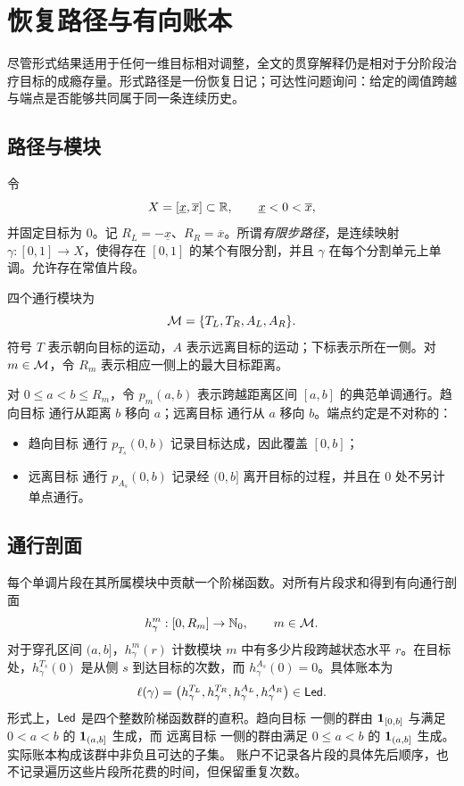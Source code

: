 \section{恢复路径与有向账本}\label{sec:environment}

尽管形式结果适用于任何一维目标相对调整，全文的贯穿解释仍是相对于分阶段治疗目标的成瘾存量。形式路径是一份恢复日记；可达性问题询问：给定的阈值跨越与端点是否能够共同属于同一条连续历史。

\subsection{路径与模块}

令
\[
 X=[\underline x,\overline x]\subset\mathbb R,
 \qquad \underline x<0<\overline x,
\]
并固定目标为 $0$。记 $R_L=-\underline x$、$R_R=\overline x$。所谓\emph{有限步路径}，是连续映射 $\gamma:[0,1]\to X$，使得存在 $[0,1]$ 的某个有限分割，并且 $\gamma$ 在每个分割单元上单调。允许存在常值片段。

四个通行模块为
\[
 \mathcal M=\{T_L,T_R,A_L,A_R\}.
\]
符号 $T$ 表示朝向目标的运动，$A$ 表示远离目标的运动；下标表示所在一侧。对 $m\in\mathcal M$，令 $R_m$ 表示相应一侧上的最大目标距离。

对 $0\le a<b\le R_m$，令 $p_m(a,b)$ 表示跨越距离区间 $[a,b]$ 的典范单调通行。趋向目标 通行从距离 $b$ 移向 $a$；远离目标 通行从 $a$ 移向 $b$。端点约定是不对称的：
\begin{itemize}
 \item 趋向目标 通行 $p_{T_s}(0,b)$ 记录目标达成，因此覆盖 $[0,b]$；
 \item 远离目标 通行 $p_{A_s}(0,b)$ 记录经 $(0,b]$ 离开目标的过程，并且在 $0$ 处不另计单点通行。
\end{itemize}

\subsection{通行剖面}

每个单调片段在其所属模块中贡献一个阶梯函数。对所有片段求和得到有向通行剖面
\[
 h^m_\gamma:[0,R_m]\to\mathbb N_0,
 \qquad m\in\mathcal M.
\]
对于穿孔区间 $(a,b]$，$h^m_\gamma(r)$ 计数模块 $m$ 中有多少片段跨越状态水平 $r$。在目标处，$h^{T_s}_\gamma(0)$ 是从侧 $s$ 到达目标的次数，而 $h^{A_s}_\gamma(0)=0$。具体账本为
\[
 \ell(\gamma)
 =\bigl(h^{T_L}_\gamma,h^{T_R}_\gamma,h^{A_L}_\gamma,h^{A_R}_\gamma\bigr)
 \in\mathsf{Led}.
\]
形式上，$\mathsf{Led}$ 是四个整数阶梯函数群的直积。趋向目标 一侧的群由 $\mathbf 1_{[0,b]}$ 与满足 $0<a<b$ 的 $\mathbf 1_{(a,b]}$ 生成，而 远离目标 一侧的群由满足 $0\le a<b$ 的 $\mathbf 1_{(a,b]}$ 生成。实际账本构成该群中非负且可达的子集。
账户不记录各片段的具体先后顺序，也不记录遍历这些片段所花费的时间，但保留重复次数。

